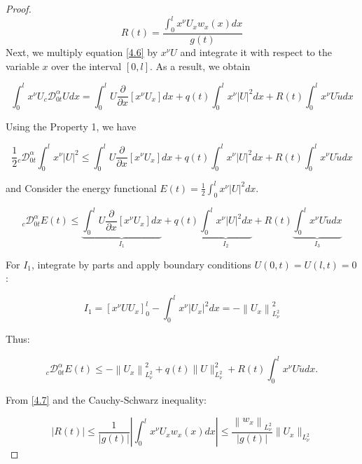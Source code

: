 \documentclass[reqno]{amsart}
\theoremstyle{definition}
\numberwithin{equation}{section}
\begin{document}
\begin{proof}
\begin{equation}\label{4.7}
    R(t)=\frac{\int_0^l x^{\nu}U_{x}w_x(x)dx}{g(t)}
\end{equation}
Next, we multiply equation \eqref{4.6} by $x^{\nu}U$ and integrate it with respect to the variable $x$ over the interval $[0,l]$. As a result, we obtain 

\begin{equation*}
    \int_0^l x^{\nu}U{_c}\mathcal{D}_{0t}^{\alpha}Udx=\int_0^l U\frac{\partial}{\partial x}\left[x^{\nu}U_x\right]dx+q(t)\int_0^lx^{\nu}|U|^2dx+R(t)\int_0^l x^{\nu}U\tilde{u}dx
 \end{equation*}



Using the Property 1, we have 

\begin{equation*}
    \frac{1}{2}{_c}\mathcal{D}_{0t}^\alpha \int_0^l x^{\nu} |U|^2\leq \int_0^l U\frac{\partial}{\partial x}\left[x^{\nu}U_x\right]dx+q(t)\int_0^lx^{\nu}|U|^2dx+R(t)\int_0^l x^{\nu}U\tilde{u}dx
 \end{equation*}




and Consider the energy functional $E(t)=\frac{1}{2} \int_0^lx^{\nu}|U|^2 d x$.

\begin{equation*}
    {_c}\mathcal{D}_{0t}^{\alpha}E(t)\leq \underbrace{\int_0^l U\frac{\partial}{\partial x}\left[x^{\nu}U_x\right]dx}_{I_1}+q(t)\underbrace{\int_0^lx^{\nu}|U|^2dx}_{I_2}+R(t)\underbrace{\int_0^l x^{\nu}U\tilde{u}dx}_{I_3}
\end{equation*}


For $I_1$, integrate by parts and apply boundary conditions $U(0, t)=U(l, t)=0$ :

\begin{equation*}
    I_1=\left[x^{\nu}U U_x\right]_0^l-\int_0^lx^{\nu}\left|U_x\right|^2 d x=-\left\|U_x\right\|_{L_{\nu}^2}^2
\end{equation*}

Thus:

\begin{equation}\label{4.8}
     {_c}\mathcal{D}_{0t}^{\alpha} E(t)\leq-\left\|U_x\right\|_{L_{\nu}^2}^2+q(t)\|U\|_{L_{\nu}^2}^2+R(t) \int_0^l x^{\nu}U \tilde{u} d x.
\end{equation}



From \eqref{4.7} and the Cauchy-Schwarz inequality:

\begin{equation*}
    |R(t)| \leq \frac{1}{|g(t)|}\left|\int_0^l x^{\nu}U_x w_{x}(x) d x\right| \leq \frac{\left\|w_{x}\right\|_{L_{\nu}^2}}{|g(t)|}\|U_x\|_{L_{\nu}^2}
\end{equation*}



\end{proof}
\end{document}
